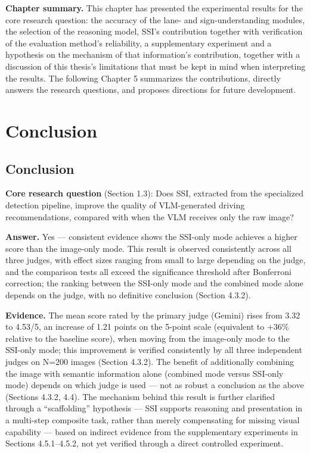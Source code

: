 \documentclass[12pt,a4paper]{report}
\begin{document}
\textbf{Chapter summary.} This chapter has presented the experimental results for the core research question: the accuracy of the lane- and sign-understanding modules, the selection of the reasoning model, SSI's contribution together with verification of the evaluation method's reliability, a supplementary experiment and a hypothesis on the mechanism of that information's contribution, together with a discussion of this thesis's limitations that must be kept in mind when interpreting the results. The following Chapter 5 summarizes the contributions, directly answers the research questions, and proposes directions for future development.

\chapter{Conclusion}

\section{Conclusion}

\textbf{Core research question} (Section 1.3): Does SSI, extracted from the specialized detection pipeline, improve the quality of VLM-generated driving recommendations, compared with when the VLM receives only the raw image?

\textbf{Answer.} Yes --- consistent evidence shows the SSI-only mode achieves a higher score than the image-only mode. This result is observed consistently across all three judges, with effect sizes ranging from small to large depending on the judge, and the comparison tests all exceed the significance threshold after Bonferroni correction; the ranking between the SSI-only mode and the combined mode alone depends on the judge, with no definitive conclusion (Section 4.3.2).

\textbf{Evidence.} The mean score rated by the primary judge (Gemini) rises from 3.32 to 4.53/5, an increase of 1.21 points on the 5-point scale (equivalent to +36\% relative to the baseline score), when moving from the image-only mode to the SSI-only mode; this improvement is verified consistently by all three independent judges on N=200 images (Section 4.3.2). The benefit of additionally combining the image with semantic information alone (combined mode versus SSI-only mode) depends on which judge is used --- not as robust a conclusion as the above (Sections 4.3.2, 4.4). The mechanism behind this result is further clarified through a ``scaffolding'' hypothesis --- SSI supports reasoning and presentation in a multi-step composite task, rather than merely compensating for missing visual capability --- based on indirect evidence from the supplementary experiments in Sections 4.5.1--4.5.2, not yet verified through a direct controlled experiment.
\end{document}
